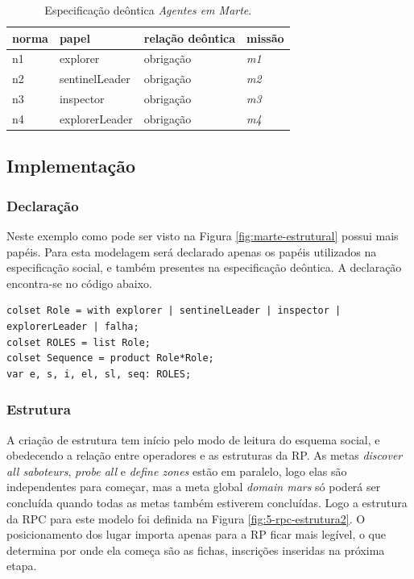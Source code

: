 \begin{table}[ht]
\centering
\caption{Especificação deôntica \textit{Agentes em Marte}. \cite{zatelli2013smadas}}
\label{tab:marte-deontica}
\begin{tabular}{@{}llll@{}}
\toprule
norma   & papel         & relação deôntica  & missão                    \\ \midrule
n1      & explorer          & obrigação         & \textit{m1}               \\
n2      & sentinelLeader    & obrigação         & \textit{m2}               \\
n3      & inspector         & obrigação         & \textit{m3}               \\
n4      & explorerLeader    & obrigação         & \textit{m4}               \\
\bottomrule
\end{tabular}
\end{table}
  
\subsection{Implementação}

\subsubsection{Declaração}

Neste exemplo como pode ser visto na Figura \ref{fig:marte-estrutural} possui mais papéis. Para esta modelagem será declarado apenas os papéis utilizados na especificação social, e também presentes na especificação deôntica. A declaração encontra-se no código abaixo.

\begin{lstlisting}
colset Role = with explorer | sentinelLeader | inspector | explorerLeader | falha;
colset ROLES = list Role;
colset Sequence = product Role*Role;
var e, s, i, el, sl, seq: ROLES;
\end{lstlisting}

\subsubsection{Estrutura}

A criação de estrutura tem início pelo modo de leitura do esquema social, e obedecendo a relação entre operadores e as estruturas da RP. As metas \textit{discover all saboteurs}, \textit{probe all} e \textit{define zones} estão em paralelo, logo elas são independentes para começar, mas a meta global \textit{domain mars} só poderá ser concluída quando todas as metas também estiverem concluídas. Logo a estrutura da RPC para este modelo foi definida na Figura \ref{fig:5-rpc-estrutura2}. O posicionamento dos lugar importa apenas para a RP ficar mais legível, o que determina por onde ela começa são as fichas, inscrições inseridas na próxima etapa.

